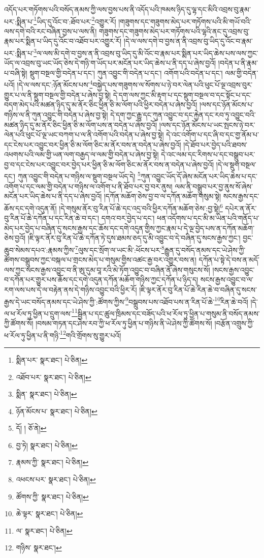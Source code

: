 འདོད་པར་གཏོགས་པའི་བསོད་ནམས་ཀྱི་ལས་བྱས་པས་ནི་འདོད་པའི་ཁམས་ཉིད་དུ་ལྷ་དང་མིའི་འབྲས་བུ་རྣམ་པར་:སྨིན་པ་\footnote{སྨིན་པར་  སྣར་ཐང་།  པེ་ཅིན། }ཡིད་དུ་འོང་བ་:ཐོབ་པར་\footnote{འཐོབ་པར་  སྣར་ཐང་།  པེ་ཅིན། }འགྱུར་རོ། །གཟུགས་དང་གཟུགས་མེད་པར་གཏོགས་པའི་མི་གཡོ་བའི་ལས་དགེ་བའི་རང་བཞིན་བྱས་པ་ལས་ནི། གཟུགས་དང་གཟུགས་མེད་པར་གཏོགས་པའི་ལྷའི་ནང་དུ་འབྲས་བུ་རྣམ་པར་སྨིན་པ་ཡིད་དུ་འོང་བ་འཐོབ་པར་འགྱུར་རོ། །དེ་ལ་ལས་དགེ་བ་བྱས་ན་ནི་འབྲས་བུ་ཡིད་དུ་འོང་བ་རྣམ་པར་:སྨིན་པ་\footnote{སྨིན་  སྣར་ཐང་།  པེ་ཅིན། }ལ་ལས་མི་དགེ་བ་བྱས་ན་ནི་འབྲས་བུ་ཡིད་དུ་མི་འོང་བ་རྣམ་པར་སྨིན་པར་ཡིད་ཆེས་པས་ལས་ཀྱང་ཡོད་ལ་འབྲས་བུ་ཡང་ཡོད་ཅེས་དེ་གཉི་ག་ཡོད་པར་མངོན་པར་ཡིད་ཆེས་པ་ནི་དད་པ་ཞེས་བྱའོ། །བདེན་པ་ནི་རྣམ་པ་བཞི་སྟེ། སྡུག་བསྔལ་གྱི་བདེན་པ་དང་། ཀུན་འབྱུང་གི་བདེན་པ་དང་། འགོག་པའི་བདེན་པ་དང་། ལམ་གྱི་བདེན་པའོ། །དེ་ལ་ལས་དང་:ཉོན་མོངས་པས་\footnote{ཉོན་མོངས་པ་  སྣར་ཐང་།  པེ་ཅིན། }བསྐྱེད་པས་གཟུགས་ལ་སོགས་པ་ཉེ་བར་ལེན་པའི་ཕུང་པོ་ལྔ་འབྲས་བུར་གྱུར་པ་ལ་ནི་སྡུག་བསྔལ་གྱི་བདེན་པ་ཞེས་བྱ་སྟེ། དེ་དག་ལས་ཀྱང་མི་རྟག་པ་དང་སྡུག་བསྔལ་བ་དང་སྟོང་པ་དང་བདག་མེད་པའི་མཚན་ཉིད་དུ་མ་ནོར་ཅིང་ཕྱིན་ཅི་མ་ལོག་པའི་ཕྱིར་བདེན་པ་ཞེས་བྱའོ། །ལས་དང་ཉོན་མོངས་པ་གཉིས་ལ་ནི་ཀུན་འབྱུང་གི་བདེན་པ་ཞེས་བྱ་སྟེ། དེ་དག་ཀྱང་རྒྱུ་དང་ཀུན་འབྱུང་བ་དང་རྐྱེན་དང་རབ་ཏུ་འབྱུང་བའི་མཚན་ཉིད་དུ་མ་ནོར་ཅིང་ཕྱིན་ཅི་མ་ལོག་པས་ན་བདེན་པ་ཞེས་བྱའོ། །ལས་དང་ཉོན་མོངས་པ་ཡང་སྤངས་ཉེ་བར་ལེན་པའི་ཕུང་པོ་ལྔ་ཡང་བཀག་པ་ལ་ནི་འགོག་པའི་བདེན་པ་ཞེས་བྱ་སྟེ། དེ་འང་འགོག་པ་དང་ཞི་བ་དང་གྱ་ནོམ་པ་དང་ངེས་པར་འབྱུང་བར་ཕྱིན་ཅི་མ་ལོག་ཅིང་མ་ནོར་བས་ན་བདེན་པ་ཞེས་བྱའོ། །དེ་ཐོབ་པར་བྱེད་པའི་ཐབས་འཕགས་པའི་ལམ་གྱི་ཡན་ལག་བརྒྱད་ལ་ལམ་གྱི་བདེན་པ་ཞེས་བྱ་སྟེ། དེ་འང་ལམ་དང་རིགས་པ་དང་བསྒྲུབ་པར་བྱ་བ་དང་ངེས་པར་འབྱུང་བར་བྱེད་པར་ཕྱིན་ཅི་མ་ལོག་ཅིང་མ་ནོར་བས་ན་བདེན་པ་ཞེས་བྱའོ། །དེ་ལ་སྡུག་བསྔལ་དང་། ཀུན་འབྱུང་གི་བདེན་པ་གཉིས་ལ་སྡུག་བསྔལ་ཡོད་དེ། \footnote{དོ། །   ཅོ་ནེ། }ཀུན་འབྱུང་ཡོད་དོ་ཞེས་མངོན་པར་ཡིད་ཆེས་པ་དང་འགོག་པ་དང་ལམ་གྱི་བདེན་པ་གཉིས་ལ་འགོག་པ་ནི་ཐོབ་པར་བྱ་བར་ནུས། ལམ་ནི་བསྒྲུབ་པར་བྱ་ནུས་སོ་ཞེས་མངོན་པར་ཡིད་ཆེས་པ་ནི་དད་པ་ཞེས་བྱའོ། །དཀོན་མཆོག་ཅེས་བྱ་བ་ལ་དཀོན་མཆོག་གསུམ་སྟེ། སངས་རྒྱས་དང་ཆོས་དང་དགེ་འདུན་ནོ། །དེ་གསུམ་ནོར་བུ་རིན་པོ་ཆེ་དང་འདྲ་བའི་ཕྱིར་དཀོན་མཆོག་ཅེས་:བྱ་སྟེ།\footnote{བྱ་ཏེ།  སྣར་ཐང་།  པེ་ཅིན། } དཔེར་ན་ནོར་བུ་རིན་པོ་ཆེ་དཀོན་པ་དང་རིན་ཆེ་བ་དང་། དགའ་བར་བྱེད་པ་དང་། ཕན་འདོགས་པ་དང་མི་མ་ཡིན་པའི་གནོད་པ་མེད་པར་བྱེད་པ་བཞིན་དུ་སངས་རྒྱས་དང་ཆོས་དང་དགེ་འདུན་གྱིས་ཀྱང་རྣམ་པ་དེ་ལྔ་བྱེད་པས་ན་དཀོན་མཆོག་ཅེས་བྱའོ། །ཇི་ལྟར་ནོར་བུ་རིན་པོ་ཆེ་དཀོན་ཏེ་དུས་ཐམས་ཅད་དུ་མི་འབྱུང་བ་དེ་བཞིན་དུ་སངས་རྒྱས་ཀྱང་། བྱང་ཆུབ་སེམས་དཔའ་:རྣམས་ཀྱིས་\footnote{རྣམས་ཀྱི་  སྣར་ཐང་།  པེ་ཅིན། }ལུས་དང་སྲོག་ལ་ཡང་མི་:ཕོངས་པར་\footnote{འཕངས་པར་  སྣར་ཐང་།  པེ་ཅིན། }རྒྱུན་དུ་བསོད་ནམས་དང་ཡེ་ཤེས་ཀྱི་ཚོགས་བསྒྲུབས་ཀྱང་བསྐལ་པ་གྲངས་མེད་པ་གསུམ་གྱིས་འཚང་རྒྱ་བར་འགྱུར་བས་ན། དཀོན་པ་སྟེ་དེ་བས་ན་མདོ་ལས་ཀྱང་སངས་རྒྱས་འབྱུང་བ་ནི་ཨུ་དུམ་བཱ་རའི་མེ་ཏོག་འབྱུང་བ་བཞིན་ནོ་ཞེས་གསུངས་སོ། །སངས་རྒྱས་འབྱུང་བ་དཀོན་པར་གྱུར་པས་ཆོས་དང་དགེ་འདུན་དཀོན་མཆོག་གཉིས་ཀྱང་དཀོན་པ་ཉིད་ད། སངས་རྒྱས་འབྱུང་བ་ལ་རག་ལས་པས་དེ་ལ་བརྟེན་ནས་དེ་གཉིས་འབྱུང་བའི་ཕྱིར་རོ། །ཇི་ལྟར་ནོར་བུ་རིན་པོ་ཆེ་རིན་ཆེ་བ་བཞིན་དུ་སངས་རྒྱས་དེ་ཡང་བསོད་ནམས་དང་ཡེ་ཤེས་ཀྱི་:ཚོགས་ཀྱིས་\footnote{ཚོགས་ཀྱི་  སྣར་ཐང་།  པེ་ཅིན། }བསྒྲུབས་པས་འཐོབ་པས་ན་རིན་པོ་ཆེ་\footnote{ཆེ་ལྟར་  སྣར་ཐང་།  པེ་ཅིན། }རིན་ཆེ་བའོ། །དེ་ལ་ཕ་རོལ་ཏུ་ཕྱིན་པ་དྲུག་ལས་\footnote{ལ་  སྣར་ཐང་།  པེ་ཅིན། }སྦྱིན་པ་དང་ཚུལ་ཁྲིམས་དང་བཟོད་པའི་ཕ་རོལ་ཏུ་ཕྱིན་པ་གསུམ་ནི་བསོད་ནམས་ཀྱི་ཚོགས་སོ། །བསམ་གཏན་དང་ཤེས་རབ་ཀྱི་ཕ་རོལ་ཏུ་ཕྱིན་པ་གཉིས་ནི་ཡེ་ཤེས་ཀྱི་ཚོགས་སོ། །བརྩོན་འགྲུས་ཀྱི་ཕ་རོལ་ཏུ་ཕྱིན་པ་ནི་གཉི་\footnote{གཉིས་  སྣར་ཐང་། }གའི་གྲོགས་སུ་གྱུར་པའོ། 